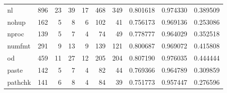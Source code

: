 \begin{longtable}{lrrrrrrrrr}
nl        &                    896 &                                 23 &                                39 &                               17 &                               468 &                             349 &                                0.801618 &                               0.974330 &                             0.389509 \\
nohup     &                    162 &                                  5 &                                 8 &                                6 &                               102 &                              41 &                                0.756173 &                               0.969136 &                             0.253086 \\
nproc     &                    139 &                                  5 &                                 7 &                                4 &                                74 &                              49 &                                0.778777 &                               0.964029 &                             0.352518 \\
numfmt    &                    291 &                                  9 &                                13 &                                9 &                               139 &                             121 &                                0.800687 &                               0.969072 &                             0.415808 \\
od        &                    459 &                                 11 &                                27 &                               12 &                               205 &                             204 &                                0.807190 &                               0.976035 &                             0.444444 \\
paste     &                    142 &                                  5 &                                 7 &                                4 &                                82 &                              44 &                                0.769366 &                               0.964789 &                             0.309859 \\
pathchk   &                    141 &                                  6 &                                 8 &                                4 &                                84 &                              39 &                                0.751773 &                               0.957447 &                             0.276596 \\

\end{longtable}
